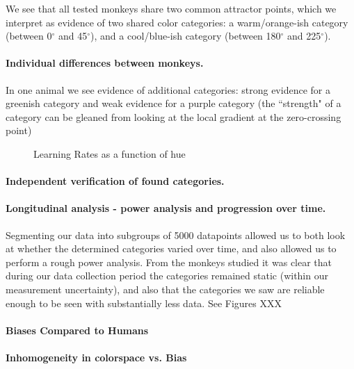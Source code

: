 We see that all tested monkeys share two common attractor points, which we interpret as evidence of two shared color categories: a warm/orange-ish category (between 0$^\circ$ and 45$^\circ$), and a cool/blue-ish category (between 180$^\circ$ and 225$^\circ$).

\paragraph{Individual differences between monkeys.}

In one animal we see evidence of additional categories: strong evidence for a greenish category and weak evidence for a purple category (the ``strength" of a category can be gleaned from looking at the local gradient at the zero-crossing point)


\begin{figure}

\caption{Learning Rates as a function of hue}
\label{fig:LearningRates}
\end{figure}

\paragraph{Independent verification of found categories.}

\paragraph{Longitudinal analysis - power analysis and progression over time.}

Segmenting our data into subgroups of 5000 datapoints allowed us to both look at whether the determined categories varied over time, and also allowed us to perform a rough power analysis. From the monkeys studied it was clear that during our data collection period the categories remained static (within our measurement uncertainty), and also that the categories we saw are reliable enough to be seen with substantially less data. See Figures XXX %



\paragraph{Biases Compared to Humans}

\paragraph{Inhomogeneity in colorspace vs. Bias}